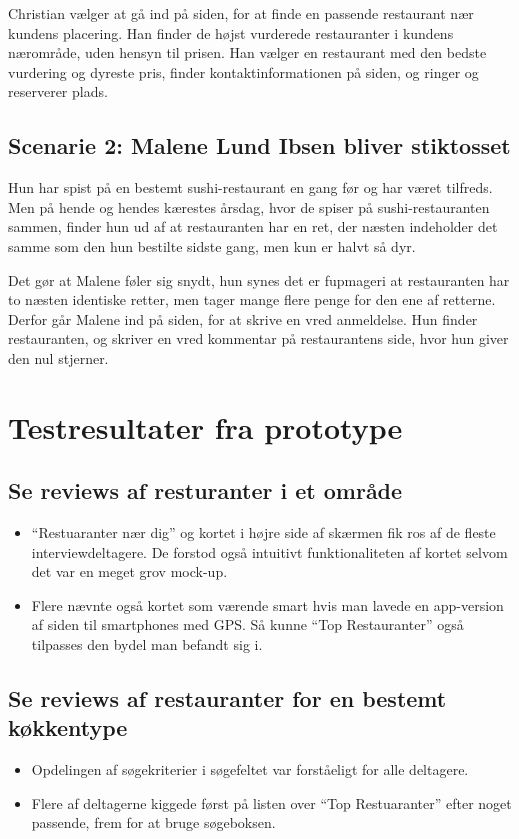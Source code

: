 \documentclass[a4paper, 12pt]{article}
\newcommand\pic[1]{\texttt{[image: ../oevelse6/Pics/\#1]}}
\newcommand\goodidea{\pic{goodidea}}
\newcommand\good{\pic{good}}
\newcommand\smallprob{\pic{smallproblem}}
\begin{document}
Christian vælger at gå ind på siden, for at finde en passende restaurant nær
kundens placering. Han finder de højst vurderede restauranter i kundens
nærområde, uden hensyn til prisen. Han vælger en restaurant med den bedste
vurdering og dyreste pris, finder kontaktinformationen på siden, og ringer og
reserverer plads.

\subsection{Scenarie 2: Malene Lund Ibsen bliver stiktosset}
\label{sub:Scenarie 2: Malene Lund Ibsen}

Hun har spist på en bestemt sushi-restaurant en gang før og har været tilfreds.
Men på hende og hendes kærestes årsdag, hvor de spiser på sushi-restauranten
sammen, finder hun ud af at restauranten har en ret, der næsten indeholder det
samme som den hun bestilte sidste gang, men kun er halvt så dyr.

Det gør at Malene føler sig snydt, hun synes det er fupmageri at restauranten
har to næsten identiske retter, men tager mange flere penge for den ene af
retterne. Derfor går Malene ind på siden, for at skrive en vred anmeldelse.  Hun
finder restauranten, og skriver en vred kommentar på restaurantens side, hvor
hun giver den nul stjerner.
\section{Testresultater fra prototype}
\label{sec:Testresultater fra prototype}

\subsection{Se reviews af resturanter i et område}
\begin{itemize}
\item[\good] ``Restuaranter nær dig'' og kortet i højre side af skærmen fik ros af de fleste interviewdeltagere. De forstod også intuitivt funktionaliteten af kortet selvom det var en meget grov mock-up.
\item[\goodidea] Flere nævnte også kortet som værende smart hvis man lavede en app-version af siden til smartphones med GPS. Så kunne ``Top Restauranter'' også tilpasses den bydel man befandt sig i.
\end{itemize}

\subsection{Se reviews af restauranter for en bestemt køkkentype}
\begin{itemize}
\item[\good] Opdelingen af søgekriterier i søgefeltet var forståeligt for alle deltagere.
\item[\smallprob] Flere af deltagerne kiggede først på listen over ``Top Restuaranter'' efter noget passende, frem for at bruge søgeboksen. 
\end{itemize}
\end{document}

